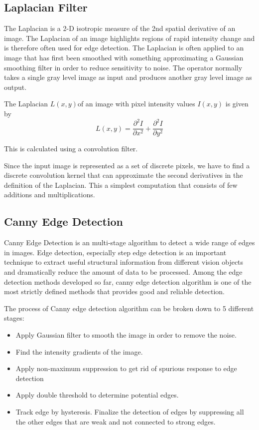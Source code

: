 \documentclass[conference]{IEEEtran}
\begin{document}
\subsection{Laplacian Filter}
The Laplacian is a 2-D isotropic measure of the 2nd spatial derivative of an image. The Laplacian of an image highlights regions of rapid intensity change and is therefore often used for edge detection. The Laplacian is often applied to an image that has first been smoothed with something approximating a Gaussian smoothing filter in order to reduce sensitivity to noise. The operator normally takes a single gray level image as input and produces another gray level image as output.

The Laplacian \begin{math} L(x,y)\end{math}of an image with pixel intensity values \begin{math}I(x,y)\end{math} is given by 
\begin{equation}
L(x,y) = \frac{\partial^2 I}{\partial x^2} + \frac{\partial^2 I}{\partial y^2}
\end{equation} 

This is calculated using a convolution filter.

Since the input image is represented as a set of discrete pixels, we have to find a discrete convolution kernel that can approximate the second derivatives in the definition of the Laplacian. This a simplest computation that consists of few additions and multiplications.

\subsection{Canny Edge Detection}
Canny Edge Detection\cite{Canny86} is an multi-stage algorithm to detect a wide range of edges in images. Edge detection, especially step edge detection is an important technique to extract useful structural information from different vision objects and dramatically reduce the amount of data to be processed. Among the edge detection methods developed so far, canny edge detection algorithm is one of the most strictly defined methods that provides good and reliable detection.

The process of Canny edge detection algorithm can be broken down to 5 different stages:

\begin{itemize}
	\item Apply Gaussian filter to smooth the image in order to remove the noise.
	\item Find the intensity gradients of the image.
	\item Apply non-maximum suppression to get rid of spurious response to edge detection
	\item Apply double threshold to determine potential edges.
	\item Track edge by hysteresis. Finalize the detection of edges by suppressing all the other edges that are weak and not connected to strong edges. 
\end{itemize}
\end{document}
